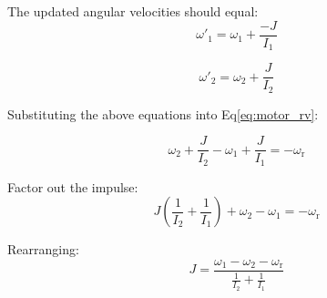 \documentclass[12pt]{article}
\begin{document}
\noindent 
The updated angular velocities should equal:
\begin{equation*}
 \omega'_\text{1} =   \omega_\text{1} + \frac{-J}{I_\text{1}}
  \end{equation*}
  
\begin{equation*}
  \omega'_\text{2}  =  \omega_\text{2} +   \frac{J}{I_\text{2}}
  \end{equation*}

 
 \noindent 
 Substituting the above equations into Eq\ref{eq:motor_rv}:
 
\begin{equation*}
   \omega_\text{2} +   \frac{J}{I_\text{2}} -
   \omega_\text{1} + \frac{J}{I_\text{1}} = - \omega_\text{r}
 \end{equation*}
 
 \noindent 
 Factor out the impulse:
\begin{equation*}
 J(\frac{1}{I_\text{2}} + \frac{1}{I_\text{1}}) +
   \omega_\text{2}  -
   \omega_\text{1} = -\omega_\text{r}
 \end{equation*}
 
 \noindent 
 Rearranging: 
 \begin{equation*}
 J = \frac{  \omega_\text{1}  -    \omega_\text{2} - \omega_\text{r}}
  {\frac{1}{I_\text{2}} + \frac{1}{I_\text{1}}}
 \end{equation*}
 
\end{document}
